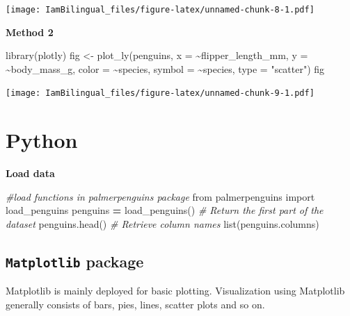 \documentclass[
]{book}
\newenvironment{Shaded}{\begin{snugshade}}{\end{snugshade}}
\newcommand{\AttributeTok}[1]{\textcolor[rgb]{0.77,0.63,0.00}{#1}}
\newcommand{\BuiltInTok}[1]{#1}
\newcommand{\CommentTok}[1]{\textcolor[rgb]{0.56,0.35,0.01}{\textit{#1}}}
\newcommand{\FunctionTok}[1]{\textcolor[rgb]{0.00,0.00,0.00}{#1}}
\newcommand{\ImportTok}[1]{#1}
\newcommand{\NormalTok}[1]{#1}
\newcommand{\OperatorTok}[1]{\textcolor[rgb]{0.81,0.36,0.00}{\textbf{#1}}}
\newcommand{\OtherTok}[1]{\textcolor[rgb]{0.56,0.35,0.01}{#1}}
\newcommand{\SpecialCharTok}[1]{\textcolor[rgb]{0.00,0.00,0.00}{#1}}
\newcommand{\StringTok}[1]{\textcolor[rgb]{0.31,0.60,0.02}{#1}}
\begin{document}
\texttt{[image: IamBilingual\_files/figure-latex/unnamed-chunk-8-1.pdf]}

\textbf{Method 2}

\begin{Shaded}
\begin{Highlighting}[]
\FunctionTok{library}\NormalTok{(plotly)}
\NormalTok{fig }\OtherTok{\textless{}{-}} \FunctionTok{plot\_ly}\NormalTok{(penguins, }
               \AttributeTok{x =} \SpecialCharTok{\textasciitilde{}}\NormalTok{flipper\_length\_mm,}
               \AttributeTok{y =} \SpecialCharTok{\textasciitilde{}}\NormalTok{body\_mass\_g, }
               \AttributeTok{color =} \SpecialCharTok{\textasciitilde{}}\NormalTok{species,}
               \AttributeTok{symbol =} \SpecialCharTok{\textasciitilde{}}\NormalTok{species,}
               \AttributeTok{type =} \StringTok{"scatter"}\NormalTok{)}
\NormalTok{fig}
\end{Highlighting}
\end{Shaded}

\texttt{[image: IamBilingual\_files/figure-latex/unnamed-chunk-9-1.pdf]}

\hypertarget{python-5}{%
\section{Python}\label{python-5}}

\textbf{Load data}

\begin{Shaded}
\begin{Highlighting}[]
\CommentTok{\#load functions in palmerpenguins package}
\ImportTok{from}\NormalTok{ palmerpenguins }\ImportTok{import}\NormalTok{ load\_penguins}
\NormalTok{penguins }\OperatorTok{=}\NormalTok{ load\_penguins()}
\CommentTok{\# Return the first part of the dataset}
\NormalTok{penguins.head()}
\CommentTok{\# Retrieve column names}
\BuiltInTok{list}\NormalTok{(penguins.columns)}
\end{Highlighting}
\end{Shaded}

\hypertarget{matplotlib-package}{%
\subsection{\texorpdfstring{\texttt{Matplotlib} package}{Matplotlib package}}\label{matplotlib-package}}

Matplotlib is mainly deployed for basic plotting. Visualization using Matplotlib generally consists of bars, pies, lines, scatter plots and so on.
\end{document}
